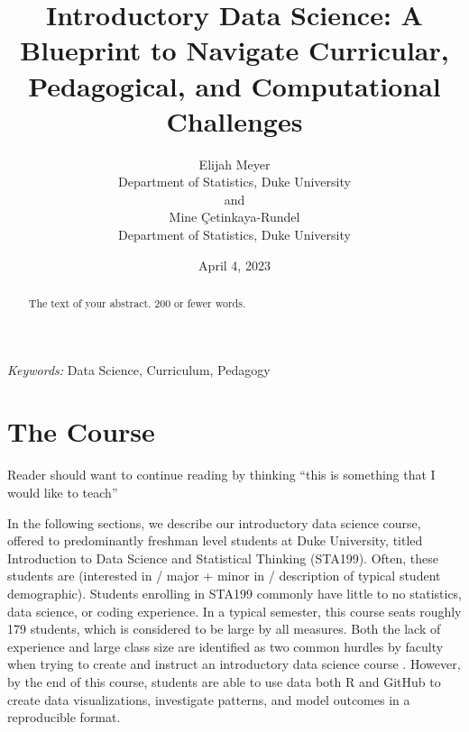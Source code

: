 \documentclass[
  12pt]{article}
\begin{document}
\def\spacingset#1{\renewcommand{\baselinestretch}%
{#1}\small\normalsize} \spacingset{1}



\date{April 4, 2023}
\title{\bf Introductory Data Science: A Blueprint to Navigate
Curricular, Pedagogical, and Computational Challenges}
\author{
Elijah Meyer\\
Department of Statistics, Duke University\\
and\\Mine Çetinkaya-Rundel\\
Department of Statistics, Duke University\\
}
\maketitle

\bigskip
\bigskip
\begin{abstract}
The text of your abstract. 200 or fewer words.
\end{abstract}

\noindent%
{\it Keywords:} Data Science, Curriculum, Pedagogy
\vfill

\newpage
\spacingset{1.9} %
\ifdefined\Shaded\renewenvironment{Shaded}{\begin{tcolorbox}[sharp corners, interior hidden, frame hidden, enhanced, borderline west={3pt}{0pt}{shadecolor}, breakable, boxrule=0pt]}{\end{tcolorbox}}\fi

\hypertarget{sec-course}{%
\section{The Course}\label{sec-course}}

Reader should want to continue reading by thinking ``this is something
that I would like to teach''

In the following sections, we describe our introductory data science
course, offered to predominantly freshman level students at Duke
University, titled Introduction to Data Science and Statistical Thinking
(STA199). Often, these students are (interested in / major + minor in /
description of typical student demographic). Students enrolling in
STA199 commonly have little to no statistics, data science, or coding
experience. In a typical semester, this course seats roughly 179
students, which is considered to be large by all measures. Both the lack
of experience and large class size are identified as two common hurdles
by faculty when trying to create and instruct an introductory data
science course \citep{Schwab2020, Kok_2008}. However, by the end of this
course, students are able to use data both R and GitHub to create data
visualizations, investigate patterns, and model outcomes in a
reproducible format.
\end{document}
